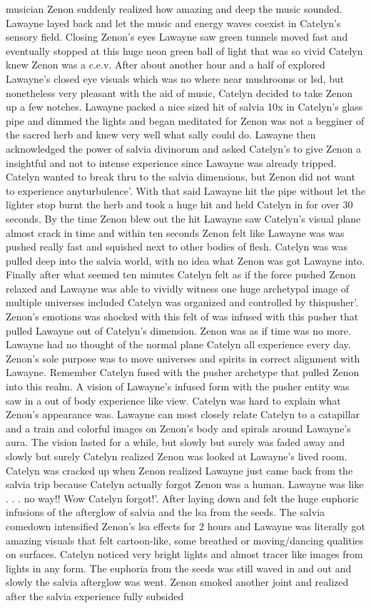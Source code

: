 \documentclass[12pt]{book}
\begin{document}
musician Zenon suddenly realized how amazing and deep the music sounded. Lawayne layed back and let the music and energy waves coexist in Catelyn's sensory field. Closing Zenon's eyes Lawayne saw green tunnels moved fast and eventually stopped at this huge neon green ball of light that was so vivid Catelyn knew Zenon was a c.e.v. After about another hour and a half of explored Lawayne's closed eye visuals which was no where near mushrooms or lsd, but nonetheless very pleasant with the aid of music, Catelyn decided to take Zenon up a few notches. Lawayne packed a nice sized hit of salvia 10x in Catelyn's glass pipe and dimmed the lights and began meditated for Zenon was not a begginer of the sacred herb and knew very well what sally could do. Lawayne then acknowledged the power of salvia divinorum and asked Catelyn's to give Zenon a insightful and not to intense experience since Lawayne was already tripped. Catelyn wanted to break thru to the salvia dimensions, but Zenon did not want to experience anyturbulence'. With that said Lawayne hit the pipe without let the lighter stop burnt the herb and took a huge hit and held Catelyn in for over 30 seconds. By the time Zenon blew out the hit Lawayne saw Catelyn's visual plane almost crack in time and within ten seconds Zenon felt like Lawayne was was pushed really fast and squished next to other bodies of flesh. Catelyn was was pulled deep into the salvia world, with no idea what Zenon was got Lawayne into. Finally after what seemed ten minutes Catelyn felt as if the force pushed Zenon relaxed and Lawayne was able to vividly witness one huge archetypal image of multiple universes included Catelyn was organized and controlled by thispusher'. Zenon's emotions was shocked with this felt of was infused with this pusher that pulled Lawayne out of Catelyn's dimension. Zenon was as if time was no more. Lawayne had no thought of the normal plane Catelyn all experience every day. Zenon's sole purpose was to move universes and spirits in correct alignment with Lawayne. Remember Catelyn fused with the pusher archetype that pulled Zenon into this realm. A vision of Lawayne's infused form with the pusher entity was saw in a out of body experience like view. Catelyn was hard to explain what Zenon's appearance was. Lawayne can most closely relate Catelyn to a catapillar and a train and colorful images on Zenon's body and spirals around Lawayne's aura. The vision lasted for a while, but slowly but surely was faded away and slowly but surely Catelyn realized Zenon was looked at Lawayne's lived room. Catelyn was cracked up when Zenon realized Lawayne just came back from the salvia trip because Catelyn actually forgot Zenon was a human. Lawayne was like . . . no way!! Wow Catelyn forgot!'. After laying down and felt the huge euphoric infusions of the afterglow of salvia and the lsa from the seeds. The salvia comedown intensified Zenon's lsa effects for 2 hours and Lawayne was literally got amazing visuals that felt cartoon-like, some breathed or moving/dancing qualities on surfaces. Catelyn noticed very bright lights and almost tracer like images from lights in any form. The euphoria from the seeds was still waved in and out and slowly the salvia afterglow was went. Zenon smoked another joint and realized after the salvia experience fully subsided 
\end{document}
